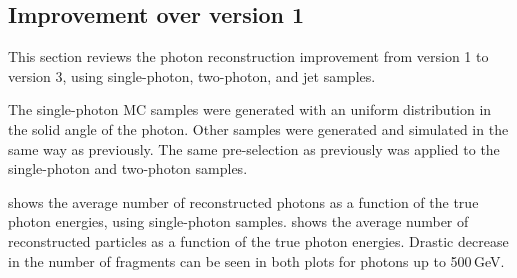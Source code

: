 \subsection{Improvement over \pandora version 1}
\label{sec:photonPerformanceCompare}

This section reviews the photon reconstruction improvement  from \pandora version 1 to version 3, using single-photon, two-photon, and jet samples.



The single-photon MC  samples were generated with an uniform distribution in the solid angle of the photon. Other samples were generated and simulated in the same way as previously. The same pre-selection as previously was applied to the  single-photon and  two-photon samples.

 shows the average number of reconstructed photons as a function of the true photon energies, using single-photon samples.  shows the average number of reconstructed particles as a function of the true photon energies. Drastic decrease in the number of fragments can be seen in both plots for photons up to 500\,GeV.


